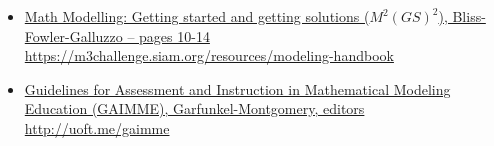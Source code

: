 \begin{lesson}
	\begin{itemize}
		\item \href{https://m3challenge.siam.org/resources/modeling-handbook}{Math Modelling: Getting started and getting solutions ($M^2(GS)^2$), Bliss-Fowler-Galluzzo -- pages 10-14} \\
		\hfill \url{https://m3challenge.siam.org/resources/modeling-handbook}
		
		\item \href{http://uoft.me/gaimme}{Guidelines for Assessment and Instruction in Mathematical Modeling Education (GAIMME), Garfunkel-Montgomery, editors}
		\hfill \url{http://uoft.me/gaimme}
	\end{itemize}
\end{lesson}






\def\email{
	\thispagestyle{siam2019}
	\begin{graybox}
	-------- Forwarded Message -------- \\[10pt]
	\textbf{Date: } \dayofweekname{7}{9}{\the\year}, 7 September \the\year \; 21:41:35 + 0000  \\
	\textbf{From: } CEO <theCEO@theBigCompany.ca> \\
	\textbf{To: } Human Resources <hr@theBigCompany.ca> \\
	\textbf{Subject: } they're still late! \\
	
	Hey Shophika! \\
	
	I still get complaints about staff being late, some by 15 minutes.
	
	With the staff we have, that's about one salary lost.
	
	Again the bottleneck of the elevators seems to be the problem.
	
	Can you suggest solutions? \\
	
	Thanks, the CEO
	\end{graybox}
	
	(\newurl{problem adapted from GAIMME, SIAM}{http://uoft.me/gaimme})
}



